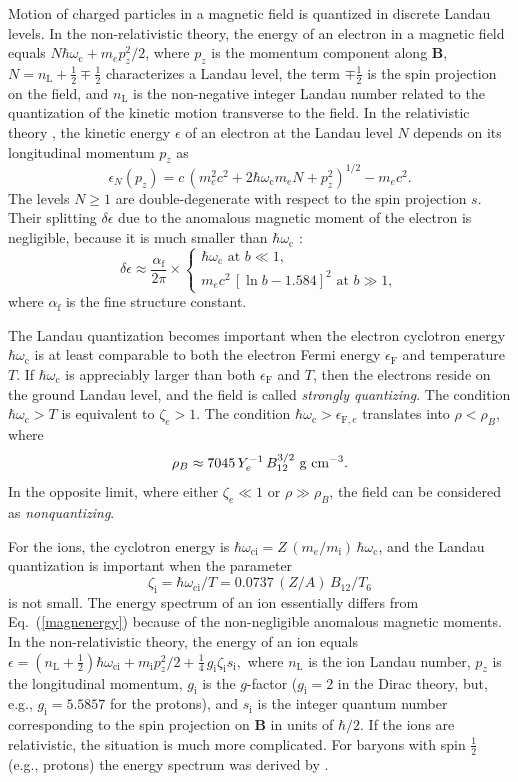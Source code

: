 \documentclass[smallextended]{svjour3}       %
\newcommand{\beq}{\begin{equation}}
\newcommand{\eeq}{\end{equation}}
\newcommand{\alphaf}{\alpha_\mathrm{f}}
\newcommand{\EF}{\epsilon_\mathrm{F}}
\newcommand{\EFe}{\epsilon_{\mathrm{F},e}}
\newcommand{\gcc}{\mbox{g~cm$^{-3}$}}
\newcommand{\gfact}{g_\mathrm{i}}
\newcommand{\mel}{m_e}
\newcommand{\mion}{m_\mathrm{i}}
\newcommand{\omc}{\omega_\mathrm{c}}
\newcommand{\omci}{\omega_\mathrm{ci}}
\newcommand{\req}[1]{Eq.~(\ref{#1})}
\newcommand{\sion}{s_\mathrm{i}}
\newcommand{\zete}{\zeta_e}
\newcommand{\zeti}{\zeta_\mathrm{i}}
\begin{document}
Motion of charged particles in a magnetic field is quantized
in discrete Landau levels. In the non-relativistic theory,
the energy of an electron in a magnetic field equals
$N\hbar\omc+\mel p_z^2/2$, where $p_z$ is the momentum
component along $\bm{B}$, $N=n_\mathrm{L}+\frac12\mp\frac12$
characterizes a Landau level, the term $\mp\frac12$ is the
spin projection on the field, and $n_\mathrm{L}$ is the
non-negative integer Landau number related to the
quantization of the kinetic motion transverse to the field.
In  the relativistic theory \citep[e.g.,][]{SokTer}, the
kinetic energy $\epsilon$ of an electron at the Landau level
$N$ depends on its longitudinal momentum $p_z$ as
\beq
 \epsilon_N(p_z) = c\,\left(\mel^2 c^2 + 2\hbar\omc
   \mel N+p_z^2\right)^{1/2} - \mel c^2.
\label{magnenergy}
\eeq
The levels $N\geqslant 1$ are double-degenerate with respect
to the spin projection $s$. Their splitting $\delta\epsilon$
due to the anomalous magnetic moment of the electron is
negligible, because it is much smaller than $\hbar\omc$
\citep[e.g.,][]{Schwinger,SuhMathews}: 
\beq
   \delta\epsilon\approx\frac{\alphaf}{2\pi}\times
\left\{\begin{array}{l}
   \hbar\omc \mbox{~at~}b\ll1, \\
    \mel c^2\,[\ln b-1.584]^2 \mbox{~at~}b\gg1,
\end{array}\right.
\eeq
where $\alphaf$ is the fine structure constant.

The Landau quantization becomes important when the electron
cyclotron energy $\hbar\omc$ is at least comparable to both
the electron Fermi energy $\EF$ and temperature $T$. If
$\hbar\omc$ is appreciably larger than both $\EF$ and $T$,
then the electrons reside on the ground Landau level, and the
field is called \emph{strongly quantizing}. The condition
$\hbar\omc>T$ is equivalent to $\zete>1$. The condition
$\hbar\omc>\EFe$ translates into $\rho < \rho_B$, where
\beq
  \rho_B 
  \approx 7045 \,Y_e^{-1}\,B_{12}^{3/2}\text{ \gcc}.
\label{rho_B}
\eeq
In the opposite limit, where either $\zete\ll1$ or
$\rho\gg\rho_B$, the field can be considered as
\emph{nonquantizing}.

For the ions, the cyclotron energy is $\hbar\omci =
Z\,(\mel/\mion)\, \hbar\omc$, and the Landau quantization is
important when the parameter
\beq
   \zeti = \hbar\omci/T = 0.0737\,(Z/A)\,
           B_{12}/T_6
\label{omci}
\eeq
is not small. The energy spectrum of an ion essentially differs from
\req{magnenergy} because of the non-negligible anomalous
magnetic moments. In the non-relativistic theory, the energy
of an ion equals 
$   \epsilon= (n_\mathrm{L}+\frac12)\hbar\omci+\mion p_z^2/2
   + \frac14\, \gfact \zeti \sion,
$
where $n_\mathrm{L}$ is the ion Landau number, $p_z$ is the
longitudinal momentum, $\gfact$ is the $g$-factor
($\gfact=2$ in the Dirac theory, but, e.g.,
$\gfact=5.5857$ for the protons), and $\sion$ is the integer
quantum number corresponding to the spin
projection on $\bm{B}$ in units of $\hbar/2$. If the ions are
relativistic, the situation is much more complicated. For
baryons with spin $\frac12$ (e.g., protons)
the energy spectrum was derived by \citet{Broderick00}.
\end{document}
